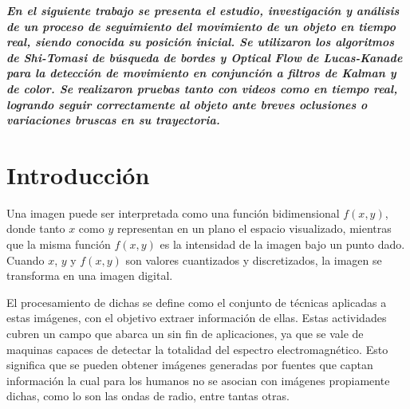 

\usepackage[procnames]{listings}









\textbf{\textit{En el siguiente trabajo se presenta el estudio, investigación y análisis de un proceso de seguimiento del movimiento de un objeto en tiempo real, siendo conocida su posición inicial. Se utilizaron los algoritmos de Shi-Tomasi de búsqueda de bordes y Optical Flow de Lucas-Kanade para la detección de movimiento en conjunción a filtros de Kalman y de color. Se realizaron pruebas tanto con videos como en tiempo real, logrando seguir correctamente al objeto ante breves oclusiones o variaciones bruscas en su trayectoria. }}


\section{Introducción}
Una imagen puede ser interpretada como una función bidimensional $f\left( x, y\right)$, donde tanto $x$ como $y$ representan en un plano el espacio visualizado, mientras que la misma función $f\left( x, y\right)$ es la intensidad de la imagen bajo un punto dado. Cuando $x$, $y$ y $f\left( x, y\right)$ son valores cuantizados y discretizados, la imagen se transforma en una imagen digital.

	 	
El procesamiento de dichas se define como el conjunto de técnicas aplicadas a estas imágenes, con el objetivo extraer información de ellas. Estas actividades cubren un campo que abarca un sin fin de aplicaciones, ya que se vale de maquinas capaces de detectar la totalidad del espectro electromagnético. Esto significa que se pueden obtener imágenes generadas por fuentes que captan información la cual para los humanos no se asocian con imágenes propiamente dichas, como lo son las ondas de radio, entre tantas otras.
	
